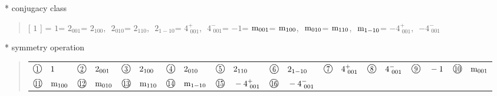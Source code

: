 \documentclass[fleqn,10pt,landscape]{jsarticle}
\begin{document}
* conjugacy class
\begin{quote}
[ $1$ ] = \quad $1$\newline[ $2{}_{001}$ ] = \quad $2{}_{001}$\newline[ $2{}_{100}$ ] = \quad $2{}_{100}$,\,\, $2{}_{010}$\newline[ $2{}_{110}$ ] = \quad $2{}_{110}$,\,\, $2{}_{1-10}$\newline[ $4^{+}_{\,\,001}$ ] = \quad $4^{+}_{\,\,001}$,\,\, $4^{-}_{\,\,001}$\newline[ $-1$ ] = \quad $-1$\newline[ ${\rm m}_{001}$ ] = \quad ${\rm m}_{001}$\newline[ ${\rm m}_{100}$ ] = \quad ${\rm m}_{100}$,\,\, ${\rm m}_{010}$\newline[ ${\rm m}_{110}$ ] = \quad ${\rm m}_{110}$,\,\, ${\rm m}_{1-10}$\newline[ $-4^{+}_{\,\,001}$ ] = \quad $-4^{+}_{\,\,001}$,\,\, $-4^{-}_{\,\,001}$\newline
\end{quote}

* symmetry operation
\begin{quote}
\begin{tabular}{llllllllll}
$ {\ooalign{\hfil\resizebox{.8\width}{\height}{1}\hfil\crcr\raise.1ex\hbox{\large$\bigcirc$}}}\quad 1 $ & $ {\ooalign{\hfil\resizebox{.8\width}{\height}{2}\hfil\crcr\raise.1ex\hbox{\large$\bigcirc$}}}\quad 2{}_{001} $ & $ {\ooalign{\hfil\resizebox{.8\width}{\height}{3}\hfil\crcr\raise.1ex\hbox{\large$\bigcirc$}}}\quad 2{}_{100} $ & $ {\ooalign{\hfil\resizebox{.8\width}{\height}{4}\hfil\crcr\raise.1ex\hbox{\large$\bigcirc$}}}\quad 2{}_{010} $ & $ {\ooalign{\hfil\resizebox{.8\width}{\height}{5}\hfil\crcr\raise.1ex\hbox{\large$\bigcirc$}}}\quad 2{}_{110} $ & $ {\ooalign{\hfil\resizebox{.8\width}{\height}{6}\hfil\crcr\raise.1ex\hbox{\large$\bigcirc$}}}\quad 2{}_{1-10} $ & $ {\ooalign{\hfil\resizebox{.8\width}{\height}{7}\hfil\crcr\raise.1ex\hbox{\large$\bigcirc$}}}\quad 4^{+}_{\,\,001} $ & $ {\ooalign{\hfil\resizebox{.8\width}{\height}{8}\hfil\crcr\raise.1ex\hbox{\large$\bigcirc$}}}\quad 4^{-}_{\,\,001} $ & $ {\ooalign{\hfil\resizebox{.8\width}{\height}{9}\hfil\crcr\raise.1ex\hbox{\large$\bigcirc$}}}\quad -1 $ & $ {\ooalign{\hfil\resizebox{.8\width}{\height}{10}\hfil\crcr\raise.1ex\hbox{\large$\bigcirc$}}}\quad {\rm m}_{001} $ \\
$ {\ooalign{\hfil\resizebox{.8\width}{\height}{11}\hfil\crcr\raise.1ex\hbox{\large$\bigcirc$}}}\quad {\rm m}_{100} $ & $ {\ooalign{\hfil\resizebox{.8\width}{\height}{12}\hfil\crcr\raise.1ex\hbox{\large$\bigcirc$}}}\quad {\rm m}_{010} $ & $ {\ooalign{\hfil\resizebox{.8\width}{\height}{13}\hfil\crcr\raise.1ex\hbox{\large$\bigcirc$}}}\quad {\rm m}_{110} $ & $ {\ooalign{\hfil\resizebox{.8\width}{\height}{14}\hfil\crcr\raise.1ex\hbox{\large$\bigcirc$}}}\quad {\rm m}_{1-10} $ & $ {\ooalign{\hfil\resizebox{.8\width}{\height}{15}\hfil\crcr\raise.1ex\hbox{\large$\bigcirc$}}}\quad -4^{+}_{\,\,001} $ & $ {\ooalign{\hfil\resizebox{.8\width}{\height}{16}\hfil\crcr\raise.1ex\hbox{\large$\bigcirc$}}}\quad -4^{-}_{\,\,001} $ & $  $ & $  $ & $  $ & $  $
\end{tabular}
\end{quote}
\end{document}

